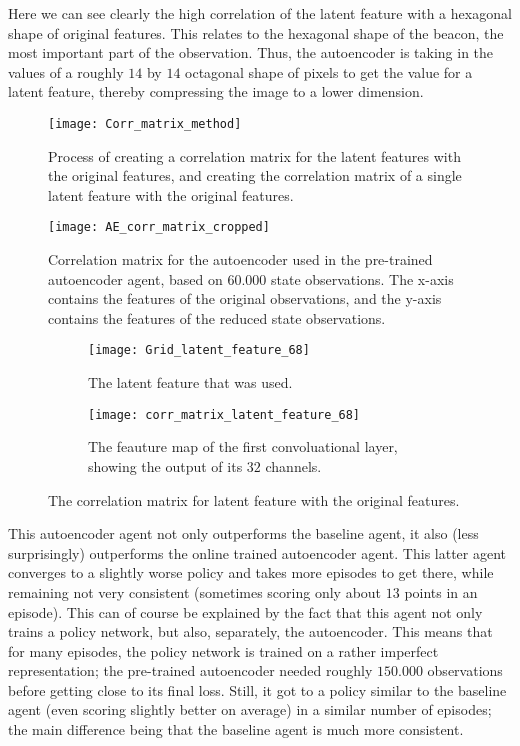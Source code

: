 Here we can see clearly the high correlation of the latent feature with a hexagonal shape of original features. This relates to the hexagonal shape of the beacon, the most important part of the observation. Thus, the autoencoder is taking in the values of a roughly $14$ by $14$ octagonal shape of pixels to get the value for a latent feature, thereby compressing the image to a lower dimension.

\begin{figure}[h!]
	\centering
	\texttt{[image: Corr\_matrix\_method]}
	\caption{Process of creating a correlation matrix for the latent features with the original features, and creating the correlation matrix of a single latent feature with the original features.}
	\label{fig:ae-corr-process}
\end{figure}

\begin{figure}[h!]
	\centering
	\texttt{[image: AE\_corr\_matrix\_cropped]}
	\caption{Correlation matrix for the autoencoder used in the pre-trained autoencoder agent, based on $60.000$ state observations. The x-axis contains the features of the original observations, and the y-axis contains the features of the reduced state observations.}
	\label{fig:ae-corr}
\end{figure}

\begin{figure}[h!]
	\centering
	\begin{subfigure}[b]{1\textwidth}
		\texttt{[image: Grid\_latent\_feature\_68]}
		\caption{The latent feature that was used.}
		\label{fig:ae-latent-feature} 
	\end{subfigure}
	\begin{subfigure}[b]{1\textwidth}
		\texttt{[image: corr\_matrix\_latent\_feature\_68]}
		\caption{The feauture map of the first convoluational layer, showing the output of its $32$ channels.}
		\label{fig:ae-latent-feature-corr-matrix}
	\end{subfigure}
	\caption{The correlation matrix for latent feature with the original features.}
	\label{fig:latent-feature-corr}
\end{figure}

This autoencoder agent not only outperforms the baseline agent, it also (less surprisingly) outperforms the online trained autoencoder agent. This latter agent converges to a slightly worse policy and takes more episodes to get there, while remaining not very consistent (sometimes scoring only about $13$ points in an episode). This can of course be explained by the fact that this agent not only trains a policy network, but also, separately, the autoencoder. This means that for many episodes, the policy network is trained on a rather imperfect representation; the pre-trained autoencoder needed roughly $150.000$ observations before getting close to its final loss. Still, it got to a policy similar to the baseline agent (even scoring slightly better on average) in a similar number of episodes; the main difference being that the baseline agent is much more consistent.

